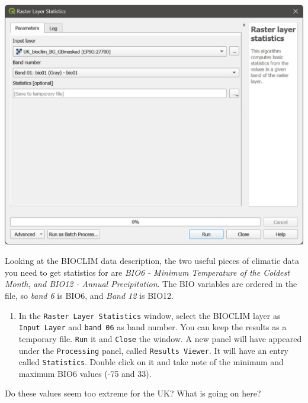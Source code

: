 \documentclass[
  letterpaper,
  DIV=11,
  numbers=noendperiod]{scrreprt}
\providecommand{\tightlist}{%
  \setlength{\itemsep}{0pt}\setlength{\parskip}{0pt}}\usepackage{longtable,booktabs,array}
\begin{document}
\includegraphics{images/lab_6/lab_6_fig1_rasterstats.jpg}

Looking at the BIOCLIM data description, the two useful pieces of
climatic data you need to get statistics for are \emph{BIO6 - Minimum
Temperature of the Coldest Month}, \emph{and BIO12 - Annual
Precipitation}. The BIO variables are ordered in the file, so \emph{band
6} is BIO6, and \emph{Band 12} is BIO12.

\begin{enumerate}
\def\labelenumi{(\arabic{enumi})}
\setcounter{enumi}{162}
\tightlist
\item
  In the \texttt{Raster\ Layer\ Statistics} window, select the BIOCLIM
  layer as \texttt{Input\ Layer} and \texttt{band\ 06} as band number.
  You can keep the results as a temporary file. \texttt{Run} it and
  \texttt{Close} the window. A new panel will have appeared under the
  \texttt{Processing} panel, called \texttt{Results\ Viewer}. It will
  have an entry called \texttt{Statistics}. Double click on it and take
  note of the minimum and maximum BIO6 values (-75 and 33).
\end{enumerate}

\begin{tcolorbox}[enhanced jigsaw, coltitle=black, toprule=.15mm, breakable, opacitybacktitle=0.6, left=2mm, colback=white, leftrule=.75mm, rightrule=.15mm, colbacktitle=quarto-callout-important-color!10!white, toptitle=1mm, titlerule=0mm, colframe=quarto-callout-important-color-frame, arc=.35mm, bottomtitle=1mm, opacityback=0, bottomrule=.15mm, title=\textcolor{quarto-callout-important-color}{\faExclamation}\hspace{0.5em}{Stop and Think}]

Do these values seem too extreme for the UK? What is going on here?

\end{tcolorbox}
\end{document}
